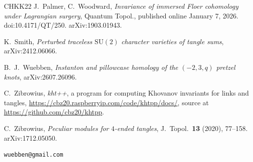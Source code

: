 \documentclass[11pt,reqno]{amsart}
\theoremstyle{plain}
\theoremstyle{definition}
\newcommand{\SU}{\mathrm{SU}(2)}
\numberwithin{equation}{section}
\begin{document}
\begin{thebibliography}{CHKK22}
 J.~Palmer, C.~Woodward, \emph{Invariance of immersed Floer
cohomology under Lagrangian surgery}, Quantum Topol., published online January 7, 2026.
doi:10.4171/QT/250. arXiv:1903.01943.

 K.~Smith, \emph{Perturbed traceless $\SU$ character varieties of tangle sums},
arXiv:2412.06066.

 B.~J.~Wuebben, \emph{Instanton and pillowcase homology of the $(-2,3,q)$ pretzel knots},
arXiv:2607.26096.

 C.~Zibrowius, \emph{kht++}, a program for computing Khovanov invariants for links and tangles,
\url{https://cbz20.raspberryip.com/code/khtpp/docs/}, source at \url{https://github.com/cbz20/khtpp}.

 C.~Zibrowius, \emph{Peculiar modules for $4$-ended tangles}, J.\ Topol.\ \textbf{13}
(2020), 77--158. arXiv:1712.05050.

\end{thebibliography}

\bigskip
{} \texttt{wuebben@gmail.com}
\end{document}
